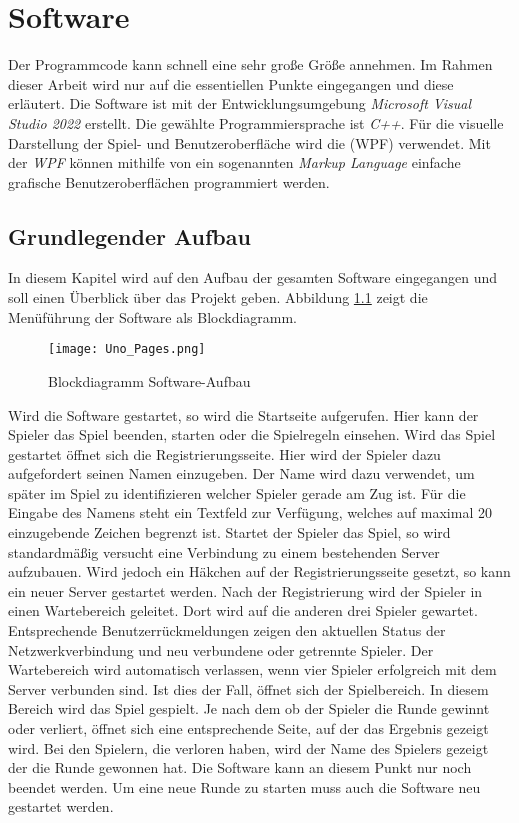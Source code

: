 
\chapter{Software}
Der Programmcode kann schnell eine sehr große Größe annehmen. Im Rahmen dieser Arbeit wird nur auf die essentiellen Punkte eingegangen und diese erläutert. Die Software ist mit der Entwicklungsumgebung \textit{Microsoft Visual Studio 2022} erstellt. Die gewählte Programmiersprache ist \textit{C++}. Für die visuelle Darstellung der Spiel- und Benutzeroberfläche wird die  (WPF) verwendet. Mit der \textit{WPF} können mithilfe von ein sogenannten \textit{Markup Language} einfache grafische Benutzeroberflächen programmiert werden.
\section{Grundlegender Aufbau}
In diesem Kapitel wird auf den Aufbau der gesamten Software eingegangen und soll einen Überblick über das Projekt geben. Abbildung \ref{fig:aufbau} zeigt die Menüführung der Software als Blockdiagramm. 
\begin{figure}[h]
	\begin{center}
		\texttt{[image: Uno\_Pages.png]}
		\caption{Blockdiagramm Software-Aufbau}
		\label{fig:aufbau}
	\end{center}
\end{figure}
Wird die Software gestartet, so wird die Startseite aufgerufen. Hier kann der Spieler das Spiel beenden, starten oder die Spielregeln einsehen. Wird das Spiel gestartet öffnet sich die Registrierungsseite. Hier wird der Spieler dazu aufgefordert seinen Namen einzugeben. Der Name wird dazu verwendet, um später im Spiel zu identifizieren welcher Spieler gerade am Zug ist. Für die Eingabe des Namens steht ein Textfeld zur Verfügung, welches auf maximal 20 einzugebende Zeichen begrenzt ist. Startet der Spieler das Spiel, so wird standardmäßig versucht eine Verbindung zu einem bestehenden Server aufzubauen. Wird jedoch ein Häkchen auf der Registrierungsseite gesetzt, so kann ein neuer Server gestartet werden. Nach der Registrierung wird der Spieler in einen Wartebereich geleitet. Dort wird auf die anderen drei Spieler gewartet. Entsprechende Benutzerrückmeldungen zeigen den aktuellen Status der Netzwerkverbindung und neu verbundene oder getrennte Spieler. Der Wartebereich wird automatisch verlassen, wenn vier Spieler erfolgreich mit dem Server verbunden sind. Ist dies der Fall, öffnet sich der Spielbereich. In diesem Bereich wird das Spiel gespielt. Je nach dem ob der Spieler die Runde gewinnt oder verliert, öffnet sich eine entsprechende Seite, auf der das Ergebnis gezeigt wird. Bei den Spielern, die verloren haben, wird der Name des Spielers gezeigt der die Runde gewonnen hat. Die Software kann an diesem Punkt nur noch beendet werden. Um eine neue Runde zu starten muss auch die Software neu gestartet werden.

